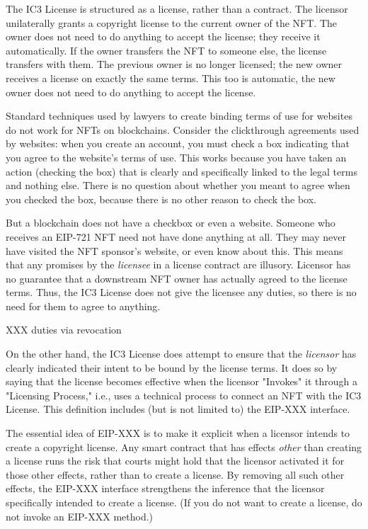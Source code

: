 \documentclass{article}
\begin{document}
The IC3 License is structured as a license, rather than a contract. The licensor unilaterally grants a copyright license to the current owner of the NFT. The owner does not need to do anything to accept the license; they receive it automatically. If the owner transfers the NFT to someone else, the license transfers with them. The previous owner is no longer licensed; the new owner receives a license on exactly the same terms. This too is automatic, the new owner does not need to do anything to accept the license.

Standard techniques used by lawyers to create binding terms of use for websites do not work for NFTs on blockchains. Consider the clickthrough agreements used by websites: when you create an account, you must check a box indicating that you agree to the website's terms of use. This works because you have taken an action (checking the box) that is clearly and specifically linked to the legal terms and nothing else. There is no question about whether you meant to agree when you checked the box, because there is no other reason to check the box. 

But a blockchain does not have a checkbox or even a website. Someone who receives an EIP-721 NFT need not have done anything at all. They may never have visited the NFT sponsor's website, or even know about this. This means that any promises by the \emph{licensee} in a license contract are  illusory. Licensor has no guarantee that a downstream NFT owner has actually agreed to the license terms. Thus, the IC3 License does not give the licensee any duties, so there is no need for them to agree to anything.

XXX duties via revocation

On the other hand, the IC3 License does attempt to ensure that the \emph{licensor} has clearly indicated their intent to be bound by the license terms. It does so by saying that the license becomes effective when the licensor "Invokes" it through a "Licensing Process," i.e., uses a technical process to connect an NFT with the IC3 License. This definition includes (but is not limited to) the EIP-XXX interface. 

The essential idea of  EIP-XXX  is to make it explicit when a licensor intends to create a copyright license. Any smart contract that has effects \emph{other} than creating a license runs the risk that courts might hold that the licensor activated it for those other effects, rather than to create a license. By removing all such other effects, the EIP-XXX interface strengthens the inference that the licensor specifically intended to create a license. (If you do not want to create a license, do not invoke an EIP-XXX method.)
\end{document}
